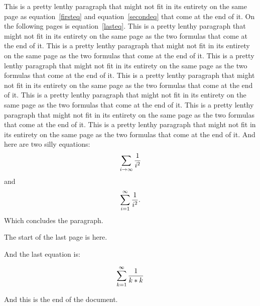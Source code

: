 \documentclass[10pt]{article}
\begin{document}
\newpage
This is a pretty lenthy paragraph that might not fit
in its entirety on the same page as equation~\ref{firsteq}
and equation~\ref{secondeq} that come at the end of it.
On the following pages is equation~\ref{lasteq}.
This is a pretty lenthy paragraph that might not fit
in its entirety on the same page as the two formulas
that come at the end of it.
This is a pretty lenthy paragraph that might not fit
in its entirety on the same page as the two formulas
that come at the end of it.
This is a pretty lenthy paragraph that might not fit
in its entirety on the same page as the two formulas
that come at the end of it.
This is a pretty lenthy paragraph that might not fit
in its entirety on the same page as the two formulas
that come at the end of it.
This is a pretty lenthy paragraph that might not fit
in its entirety on the same page as the two formulas
that come at the end of it.
This is a pretty lenthy paragraph that might not fit
in its entirety on the same page as the two formulas
that come at the end of it.
This is a pretty lenthy paragraph that might not fit
in its entirety on the same page as the two formulas
that come at the end of it.
And here are two silly equations:
\begin{equation}
\sum_{i\to\infty}{1 \over i^2}\label{firsteq}
\end{equation}
and
\makeatletter
{}
\makeatletter
\begin{equation}
\sum_{i= 1}^\infty{1 \over i^2}.\label{secondeq}
\end{equation}
Which concludes the paragraph.

\newpage
The start of the last page is here.


And the last equation is: 

\begin{equation}
\sum_{k= 1}^\infty{1 \over k*k}\label{lasteq}
\end{equation}

And this is the end of the document.
\end{document}
